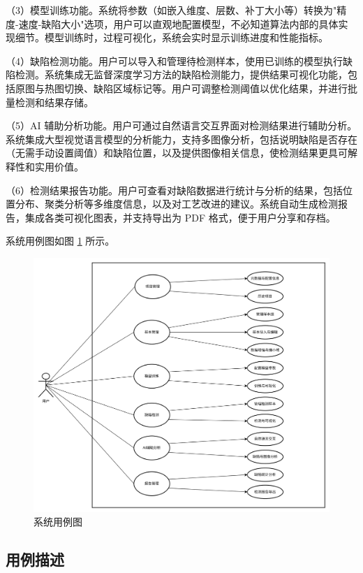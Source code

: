 \documentclass[
  ]{njuthesis}
\begin{document}
（3）模型训练功能。系统将参数（如嵌入维度、层数、补丁大小等）转换为"精度-速度-缺陷大小"选项，用户可以直观地配置模型，不必知道算法内部的具体实现细节。模型训练时，过程可视化，系统会实时显示训练进度和性能指标。

（4）缺陷检测功能。用户可以导入和管理待检测样本，使用已训练的模型执行缺陷检测。系统集成无监督深度学习方法的缺陷检测能力，提供结果可视化功能，包括原图与热图切换、缺陷区域标记等。用户可调整检测阈值以优化结果，并进行批量检测和结果存储。

（5）AI 辅助分析功能。用户可通过自然语言交互界面对检测结果进行辅助分析。系统集成大型视觉语言模型的分析能力，支持多图像分析，包括说明缺陷是否存在（无需手动设置阈值）和缺陷位置，以及提供图像相关信息，使检测结果更具可解释性和实用价值。

（6）检测结果报告功能。用户可查看对缺陷数据进行统计与分析的结果，包括位置分布、聚类分析等多维度信息，以及对工艺改进的建议。系统自动生成检测报告，集成各类可视化图表，并支持导出为 PDF 格式，便于用户分享和存档。

系统用例图如图 \ref{系统用例图} 所示。

\begin{figure}[H]
    \centering
    \includegraphics[width=\textwidth]{images/用例图.png}
    \caption{系统用例图}
    \label{系统用例图}
\end{figure}

\subsection{用例描述}
\end{document}
